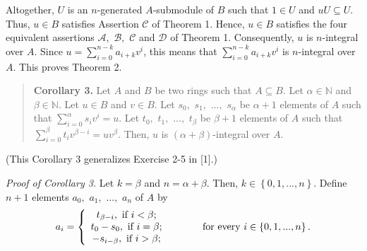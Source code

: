 \documentclass[12pt,final,notitlepage,onecolumn]{article}%
\begin{document}
Altogether, $U$ is an $n$-generated $A$-submodule of $B$ such that $1\in U$
and $uU\subseteq U$. Thus, $u\in B$ satisfies Assertion $\mathcal{C}$ of
Theorem 1. Hence, $u\in B$ satisfies the four equivalent assertions
$\mathcal{A},$ $\mathcal{B},$ $\mathcal{C}$ and $\mathcal{D}$ of Theorem 1.
Consequently, $u$ is $n$-integral over $A$. Since $u=\sum\limits_{i=0}%
^{n-k}a_{i+k}v^{i}$, this means that $\sum\limits_{i=0}^{n-k}a_{i+k}v^{i}$ is
$n$-integral over $A$. This proves Theorem 2.

\begin{quote}
\textbf{Corollary 3.} Let $A$ and $B$ be two rings such that $A\subseteq B$.
Let $\alpha\in\mathbb{N}$ and $\beta\in\mathbb{N}$. Let $u\in B$ and $v\in B$.
Let $s_{0},$ $s_{1},$ $...,$ $s_{\alpha}$ be $\alpha+1$ elements of $A$ such
that $\sum\limits_{i=0}^{\alpha}s_{i}v^{i}=u$. Let $t_{0},$ $t_{1},$ $...,$
$t_{\beta}$ be $\beta+1$ elements of $A$ such that $\sum\limits_{i=0}^{\beta
}t_{i}v^{\beta-i}=uv^{\beta}$. Then, $u$ is $\left(  \alpha+\beta\right)
$-integral over $A$.
\end{quote}

(This Corollary 3 generalizes Exercise 2-5 in [1].)

\textit{Proof of Corollary 3.} Let $k=\beta$ and $n=\alpha+\beta$. Then,
$k\in\left\{  0,1,...,n\right\}  $. Define $n+1$ elements $a_{0},$ $a_{1},$
$...,$ $a_{n}$ of $A$ by%
\[
a_{i}=\left\{
\begin{array}
[c]{c}%
t_{\beta-i},\text{ if }i<\beta;\\
t_{0}-s_{0},\text{ if }i=\beta;\\
-s_{i-\beta},\text{ if }i>\beta;
\end{array}
\right.  \ \ \ \ \ \ \ \ \ \ \text{for every }i\in\left\{  0,1,...,n\right\}
.
\]
\end{document}
